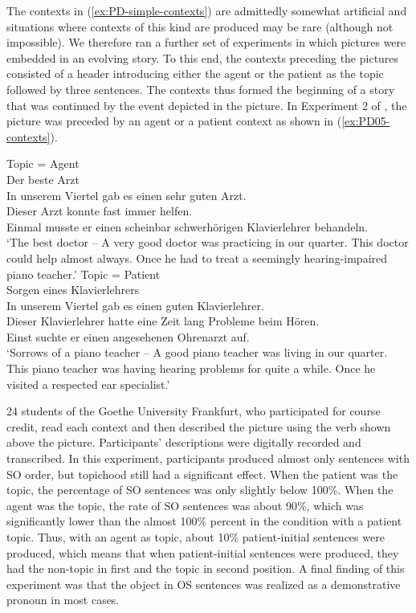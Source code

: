 \documentclass[output=paper,colorlinks,citecolor=brown]{langscibook}
\begin{document}
The contexts in (\ref{ex:PD-simple-contexts}) are admittedly somewhat artificial and situations where contexts of this kind are produced may be rare (although not impossible). We therefore ran a further set of experiments in which pictures were embedded in an evolving story. To this end, the contexts preceding the pictures consisted of a header introducing either the agent or the patient as the topic followed by three sentences. The contexts thus formed the beginning of a story that was continued by the event depicted in the picture. In Experiment 2 of \citet{Bader::Portele-23-Talk-AMLaP}, the picture was preceded by an agent or a patient context as shown in (\ref{ex:PD05-contexts}).

\ea \label{ex:PD05-contexts}
  \ea  
     Topic = {Agent}\\
     Der beste Arzt\\
     In unserem Viertel gab es {einen sehr guten Arzt.} \\ 
     {Dieser Arzt} konnte fast immer helfen. \\
     Einmal musste {er} {einen scheinbar schwerhörigen} {Klavierlehrer} behandeln.\\
     \enquote*{The best doctor -- {A very good doctor} was practicing in our quarter.
               {This doctor} could help almost always.
               Once {he} had to treat {a seemingly hearing-impaired piano teacher.}}
  \ex  
     Topic = Patient\\
     Sorgen eines Klavierlehrers\\
     In unserem Viertel gab es {einen guten Klavierlehrer}.\\ 
     {Dieser Klavierlehrer} hatte eine Zeit lang Probleme beim Hören.\\
     Einst suchte {er} {einen angesehenen Ohrenarzt} auf.\\
     \enquote*{Sorrows of a piano teacher -- {A good piano teacher} was living in our quarter.
               {This piano teacher} was having hearing problems for quite a while.
                Once {he} visited {a respected ear specialist}.}
\z\z

24 students of the Goethe University Frankfurt, who participated for course credit, read each context and then described the picture using the verb shown above the picture. Participants' descriptions were digitally recorded and transcribed. In this experiment, participants produced almost only sentences with SO order, but topichood still had a significant effect. When the patient was the topic, the percentage of SO sentences was only slightly below 100\%. When the agent was the topic, the rate of SO sentences was about 90\%, which was significantly lower than the almost 100\% percent in the condition with a patient topic. Thus, with an agent as topic, about 10\% patient-initial sentences were produced, which means that when patient-initial sentences were produced, they had the non-topic in first and the topic in second position. A final finding of this experiment was that the object in OS sentences was realized as a demonstrative pronoun in most cases.
\end{document}
